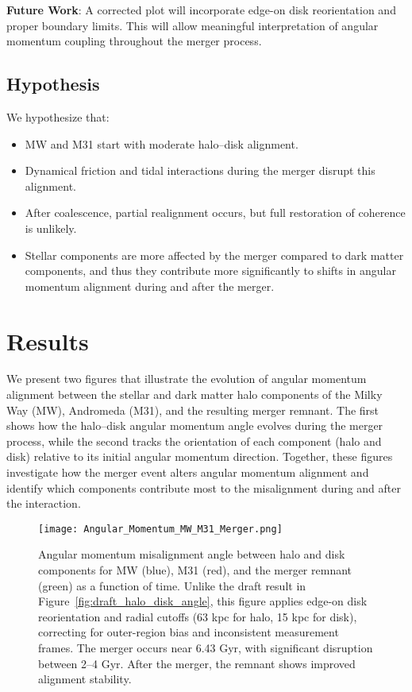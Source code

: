 \documentclass[twocolumn]{aastex631}
\begin{document}
\textbf{Future Work}: A corrected plot will incorporate edge-on disk reorientation and proper boundary limits. This will allow meaningful interpretation of angular momentum coupling throughout the merger process.


\subsection{Hypothesis}

We hypothesize that:
\begin{itemize}
    \item MW and M31 start with moderate halo–disk alignment.
    \item Dynamical friction and tidal interactions during the merger disrupt this alignment.
    \item After coalescence, partial realignment occurs, but full restoration of coherence is unlikely.
    \item Stellar components are more affected by the merger compared to dark matter components, and thus they contribute more significantly to shifts in angular momentum alignment during and after the merger.
\end{itemize}

\section{Results}

We present two figures that illustrate the evolution of angular momentum alignment between the stellar and dark matter halo components of the Milky Way (MW), Andromeda (M31), and the resulting merger remnant. The first shows how the halo–disk angular momentum angle evolves during the merger process, while the second tracks the orientation of each component (halo and disk) relative to its initial angular momentum direction. Together, these figures investigate how the merger event alters angular momentum alignment and identify which components contribute most to the misalignment during and after the interaction.

\begin{figure}[h!]
    \centering
    \texttt{[image: Angular\_Momentum\_MW\_M31\_Merger.png]}
    \caption{Angular momentum misalignment angle between halo and disk components for MW (blue), M31 (red), and the merger remnant (green) as a function of time. Unlike the draft result in Figure~\ref{fig:draft_halo_disk_angle}, this figure applies edge-on disk reorientation and radial cutoffs (63 kpc for halo, 15 kpc for disk), correcting for outer-region bias and inconsistent measurement frames. The merger occurs near 6.43 Gyr, with significant disruption between 2--4 Gyr. After the merger, the remnant shows improved alignment stability.}
    \label{fig:halo_disk_alignment}
\end{figure}
\end{document}
